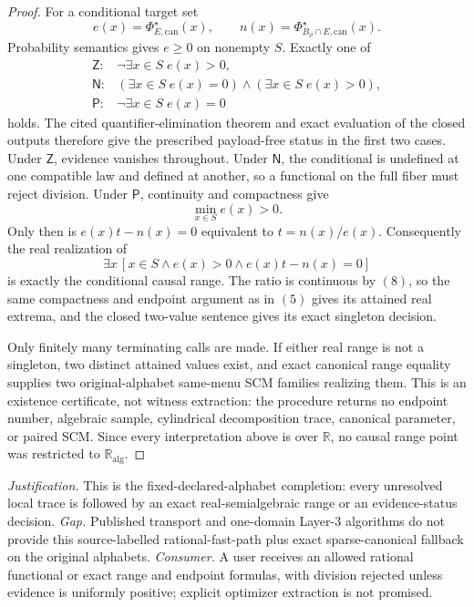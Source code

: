 \documentclass{article}
\begin{document}
\begin{proof}
For a conditional target set
\[
e(x)=\Phi_{E,\mathrm{can}}^\star(x),
\qquad
n(x)=\Phi_{B_\rho\cap E,\mathrm{can}}^\star(x).
\tag{6}
\]
Probability semantics gives \(e\geq0\) on nonempty \(S\).  Exactly one of
\[
\begin{array}{ll}
\mathsf Z:&\neg\exists x\in S\;e(x)>0,\\
\mathsf N:&(\exists x\in S\;e(x)=0)\wedge
(\exists x\in S\;e(x)>0),\\
\mathsf P:&\neg\exists x\in S\;e(x)=0
\end{array}
\tag{7}
\]
holds.  The cited quantifier-elimination theorem and exact evaluation of the closed
outputs therefore give the prescribed payload-free status in the first two cases.
Under \(\mathsf Z\), evidence vanishes throughout.  Under \(\mathsf N\), the
conditional is undefined at one compatible law and defined at another, so a
functional on the full fiber must reject division.  Under \(\mathsf P\), continuity
and compactness give
\[
\min_{x\in S}e(x)>0.
\tag{8}
\]
Only then is \(e(x)t-n(x)=0\) equivalent to \(t=n(x)/e(x)\).  Consequently the real
realization of
\[
\exists x\,[x\in S\wedge e(x)>0\wedge e(x)t-n(x)=0]
\tag{9}
\]
is exactly the conditional causal range.  The ratio is continuous by \((8)\), so
the same compactness and endpoint argument as in \((5)\) gives its attained real
extrema, and the closed two-value sentence gives its exact singleton decision.

Only finitely many terminating calls are made.  If either real range is not a
singleton, two distinct attained values exist, and exact canonical range equality
supplies two original-alphabet same-menu SCM families realizing them.  This is an
existence certificate, not witness extraction: the procedure returns no endpoint
number, algebraic sample, cylindrical decomposition trace, canonical parameter, or
paired SCM.  Since every interpretation above is over \(\mathbb R\), no causal
range point was restricted to \(\mathbb R_{\mathrm{alg}}\).
\end{proof}
\par\smallskip\noindent \textit{Justification.} This is the fixed-declared-alphabet completion: every unresolved local trace is followed by an exact real-semialgebraic range or an evidence-status decision. \textit{Gap.} Published transport and one-domain Layer-3 algorithms do not provide this source-labelled rational-fast-path plus exact sparse-canonical fallback on the original alphabets. \textit{Consumer.} A user receives an allowed rational functional or exact range and endpoint formulas, with division rejected unless evidence is uniformly positive; explicit optimizer extraction is not promised.
\end{document}
